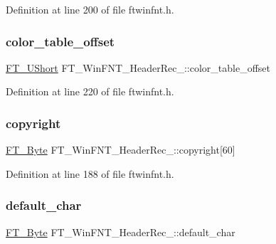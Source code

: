 Definition at line 200 of file ftwinfnt.\+h.

\mbox{\label{struct_f_t___win_f_n_t___header_rec___a83fa51bfd7fe814f8264416204701c60}} 
\subsubsection{\texorpdfstring{color\_table\_offset}{color\_table\_offset}}
{\footnotesize\ttfamily \mbox{\hyperlink{fttypes_8h_a937f6c17cf5ffd09086d8610c37b9f58}{F\+T\+\_\+\+U\+Short}} F\+T\+\_\+\+Win\+F\+N\+T\+\_\+\+Header\+Rec\+\_\+\+::color\+\_\+table\+\_\+offset}



Definition at line 220 of file ftwinfnt.\+h.

\mbox{\label{struct_f_t___win_f_n_t___header_rec___a289a835480eac30710dae8bfc04c6ae7}} 
\subsubsection{\texorpdfstring{copyright}{copyright}}
{\footnotesize\ttfamily \mbox{\hyperlink{fttypes_8h_a51f26183ca0c9f4af958939648caeccd}{F\+T\+\_\+\+Byte}} F\+T\+\_\+\+Win\+F\+N\+T\+\_\+\+Header\+Rec\+\_\+\+::copyright\mbox{[}60\mbox{]}}



Definition at line 188 of file ftwinfnt.\+h.

\mbox{\label{struct_f_t___win_f_n_t___header_rec___a3fb91e47023c6271e0d2c52f112e5e75}} 
\subsubsection{\texorpdfstring{default\_char}{default\_char}}
{\footnotesize\ttfamily \mbox{\hyperlink{fttypes_8h_a51f26183ca0c9f4af958939648caeccd}{F\+T\+\_\+\+Byte}} F\+T\+\_\+\+Win\+F\+N\+T\+\_\+\+Header\+Rec\+\_\+\+::default\+\_\+char}



